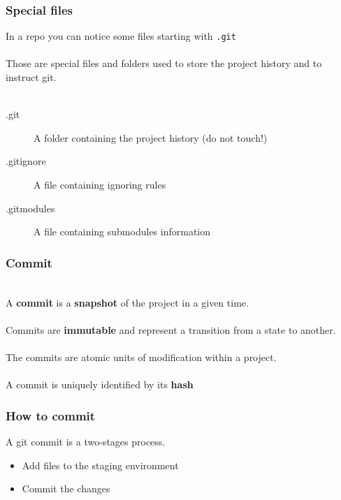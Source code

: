\documentclass{beamer}
\begin{document}
\begin{frame}
    \frametitle{Special files}
    In a repo you can notice some files starting with \texttt{.git}\\
    \hfill \\
    Those are special files and folders used to store the project history and to instruct git.
    \hfill \\\hfill \\
    \begin{description}
        \item[.git] A folder containing the project history (do not touch!)
        \item[.gitignore] A file containing ignoring rules
        \item[.gitmodules] A file containing submodules information  
    \end{description} 
\end{frame}

\begin{frame}
    \frametitle{Commit}
    
    \hfill \\
    A \textbf{commit} is a \textbf{snapshot} of the project in a given time.\\
    \hfill \\
    Commits are \textbf{immutable} and represent a transition from a state to another.\\
    \hfill \\
    The commits are atomic units of modification within a project.\\
    \hfill \\
    A commit is uniquely identified by its \textbf{hash} 
\end{frame}


\begin{frame}
    \frametitle{How to commit}
    A git commit is a two-stages process.\\
    \begin{itemize}
        \item Add files to the staging environment
        \item Commit the changes
    \end{itemize}
    
\end{frame}
\end{document}
